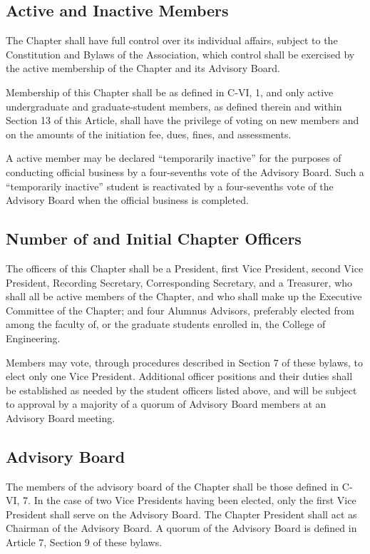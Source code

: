\documentclass{article}
\begin{document}
	\subsection{Active and Inactive Members}
	The Chapter shall have full control over its individual affairs, subject to the Constitution and Bylaws of the Association, which control shall be exercised by the active membership of the Chapter and its Advisory Board.
	
	Membership of this Chapter shall be as defined in C-VI, 1, and only active undergraduate and graduate-student members, as defined therein and within Section 13 of this Article, shall have the privilege of voting on new members and on the amounts of the initiation fee, dues, fines, and assessments. %
	
	A active member may be declared ``temporarily inactive'' for the purposes of conducting official business by a four-sevenths vote of the Advisory Board. Such a ``temporarily inactive'' student is reactivated by a four-sevenths vote of the Advisory Board when the official business is completed. %
	\subsection{Number of and Initial Chapter Officers}
	The officers of this Chapter shall be a President, first Vice President, second Vice President, Recording Secretary, Corresponding Secretary, and a Treasurer, who shall all be active members of the Chapter, and who shall make up the Executive Committee of the Chapter; and four Alumnus Advisors, preferably elected from among the faculty of, or the graduate students enrolled in, the College of Engineering.
	
	Members may vote, through procedures described in Section 7 of these bylaws, to elect only one Vice President. Additional officer positions and their duties shall be established as needed by the student officers listed above, and will be subject to approval by a majority of a quorum of Advisory Board members at an Advisory Board meeting.
	\subsection{Advisory Board}
	The members of the advisory board of the Chapter shall be those defined in C-VI, 7. In the case of two Vice Presidents having been elected, only the first Vice President shall serve on the Advisory Board. The Chapter President shall act as Chairman of the Advisory Board. A quorum of the Advisory Board is defined in Article 7, Section 9 of these bylaws. %
	
\end{document}
